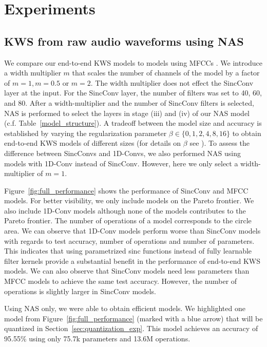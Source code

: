 \documentclass[a4paper]{article}
\begin{document}
\section{Experiments}
\label{sec:experiments}

\subsection{KWS from raw audio waveforms using NAS}
We compare our end-to-end KWS models to models using MFCCs \cite{Peter2020}. We introduce a width multiplier $m$ that scales the number of channels of the model by a factor of $m=1, m=0.5$ or $m=2$. The width multiplier does not effect the SincConv layer at the input. For the SincConv layer, the number of filters was set to 40, 60, and 80. After a width-multiplier and the number of SincConv filters is selected, NAS is performed to select the layers in stage (iii) and (iv) of our NAS model (c.f. Table~\ref{model_structure}). A tradeoff between the model size and accuracy is established by varying the regularization parameter $\beta \in \{0, 1, 2, 4, 8, 16\}$ to obtain end-to-end KWS models of different sizes (for details on $\beta$ see \cite{Peter2020}). To assess the difference between SincConvs and 1D-Convs, we also performed NAS using models with 1D-Conv instead of SincConv. However, here we only select a width-multiplier of $m=1$.

Figure~\ref{fig:full_performance} shows the performance of SincConv and MFCC models. For better visibility, we only include models on the Pareto frontier. We also include 1D-Conv models although none of the models contributes to the Pareto frontier. The number of operations of a model corresponds to the circle area. We can observe that 1D-Conv models perform worse than SincConv models with regards to test accuracy, number of operations and number of parameters. This indicates that using parametrized sinc functions instead of fully learnable filter kernels provide a substantial benefit in the performance of end-to-end KWS models. We can also observe that SincConv models need less parameters than MFCC models to achieve the same test accuracy. However, the number of operations is slightly larger in SincConv models.

Using NAS only, we were able to obtain efficient models. We highlighted one model from Figure~\ref{fig:full_performance} (marked with a blue arrow) that will be quantized in Section~\ref{sec:quantization_exp}. This model achieves an accuracy of 95.55\% using only 75.7k parameters and 13.6M operations.
\end{document}
